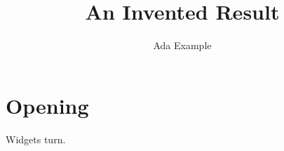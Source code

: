 \documentclass[12pt,twocolumn]{inventedwith}
\title{An Invented Result}
\author{Ada Example}
\begin{document}
\maketitle
\section{Opening}
Widgets turn.
\end{document}
